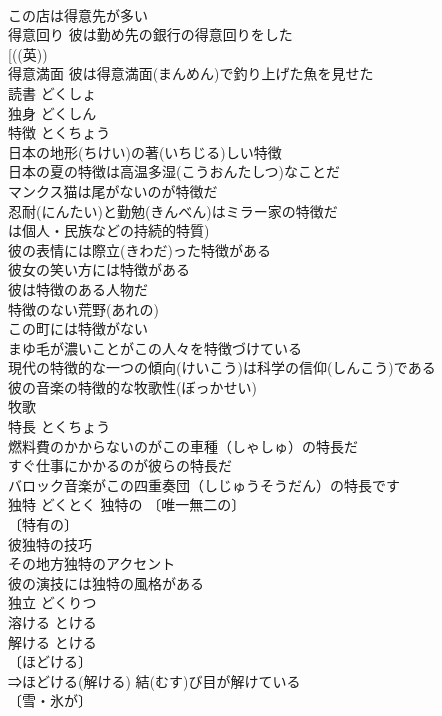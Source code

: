 \documentclass[8pt]{extreport}
\begin{document}
\begin{CJK}{UTF8}{min}
\\	この店は得意先が多い 
\\	得意回り 彼は勤め先の銀行の得意回りをした 
\\	[((英))
\\	得意満面 彼は得意満面(まんめん)で釣り上げた魚を見せた 
\\	読書	どくしょ	
\\	独身	どくしん	
\\	特徴	とくちょう	
\\	日本の地形(ちけい)の著(いちじる)しい特徴 
\\	日本の夏の特徴は高温多湿(こうおんたしつ)なことだ 
\\	マンクス猫は尾がないのが特徴だ 
\\	忍耐(にんたい)と勤勉(きんべん)はミラー家の特徴だ 
\\	は個人・民族などの持続的特質) 
\\	彼の表情には際立(きわだ)った特徴がある 
\\	彼女の笑い方には特徴がある 
\\	彼は特徴のある人物だ 
\\	特徴のない荒野(あれの) 
\\	この町には特徴がない 
\\	まゆ毛が濃いことがこの人々を特徴づけている 
\\	現代の特徴的な一つの傾向(けいこう)は科学の信仰(しんこう)である 
\\	彼の音楽の特徴的な牧歌性(ぼっかせい) 
\\	牧歌 
\\	特長	とくちょう	
\\	燃料費のかからないのがこの車種（しゃしゅ）の特長だ 
\\	すぐ仕事にかかるのが彼らの特長だ 
\\	バロック音楽がこの四重奏団（しじゅうそうだん）の特長です 
\\	独特	どくとく	独特の 〔唯一無二の〕
\\	〔特有の〕
\\	彼独特の技巧 
\\	その地方独特のアクセント 
\\	彼の演技には独特の風格がある 
\\	独立	どくりつ	
\\	溶ける	とける	
\\	解ける	とける 
\\	〔ほどける〕
\\	⇒ほどける(解ける) 結(むす)び目が解けている 
\\	〔雪・氷が〕

\end{CJK}
\end{document}
